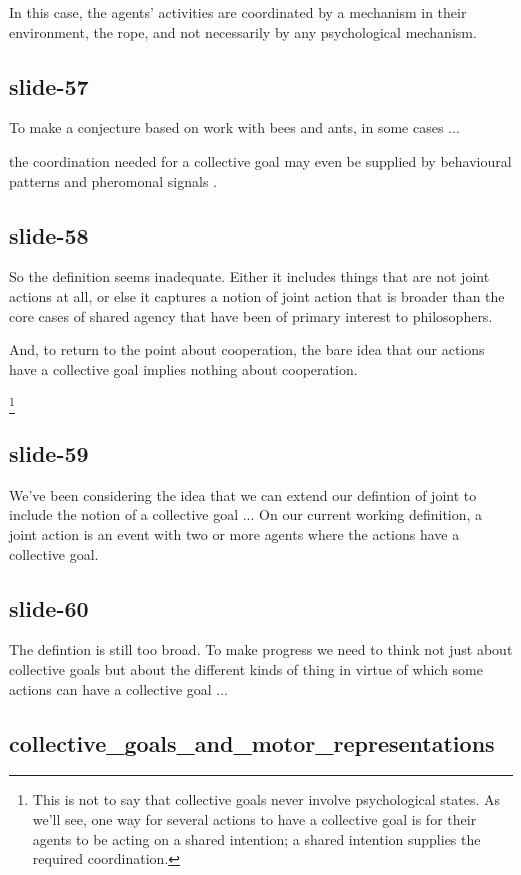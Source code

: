 \documentclass[12pt,\papersize]{extarticle}
\begin{document}
In this  case, the agents' activities are coordinated by a mechanism in their environment, the rope, and not necessarily by any psychological mechanism.

\subsection{slide-57}
To make a conjecture based on work with bees and ants, in some cases ...

the coordination needed for a collective goal may even be supplied by behavioural patterns \citep{seeley2010honeybee}   and  pheromonal signals \citep[pp.\ 178-83, 206-21]{hoelldobler2009superorganism}.

\subsection{slide-58}
So the definition seems inadequate.
Either it includes things that are not joint actions at all,
or else it captures a notion of joint action that is broader than
the core cases of shared agency that have been of primary interest to
philosophers.

And, to return to the point about cooperation, the bare idea that
our actions have a collective goal implies nothing about cooperation.

\footnote{%
This is not to say that collective goals never involve psychological states.
As we’ll see, one way for several actions to have a collective goal is for their agents to be acting on a shared intention;
a shared intention supplies the required coordination.
}

\subsection{slide-59}
We’ve been considering the idea that we can extend our defintion of joint to include the notion
of a collective goal ... On our current working definition,
a joint action is an event with two or more agents where the actions have a collective goal.

\subsection{slide-60}
The defintion is still too broad.
To make progress we need to think not just about collective goals
but about the different kinds of thing in virtue of which some actions can
have a collective goal ...

\subsection{collective\_goals\_and\_motor\_representations}
\end{document}
